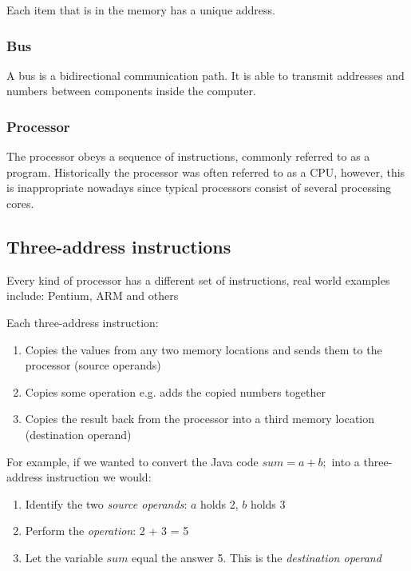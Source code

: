 \documentclass{article}
\begin{document}
Each item that is in the memory has a unique address.

\subsubsection{Bus}
A bus is a bidirectional communication path. It is able to transmit addresses and numbers between components inside the computer.

\subsubsection{Processor}
The processor obeys a sequence of instructions, commonly referred to as a program.
Historically the processor was often referred to as a CPU, however, this is inappropriate nowadays since typical processors consist of several processing cores.

\subsection{Three-address instructions}
Every kind of processor has a different set of instructions, real world examples include: Pentium, ARM and others

Each three-address instruction:
\begin{enumerate}
	\item Copies the values from any two memory locations and sends them to the processor (source operands)
	\item Copies some operation e.g. adds the copied numbers together
	\item Copies the result back from the processor into a third memory location (destination operand)
\end{enumerate}

For example, if we wanted to convert the Java code $sum = a + b;$ into a three-address instruction we would:
\begin{enumerate}
	\item Identify the two {\it source operands}: $a$ holds 2, $b$ holds 3
	\item Perform the {\it operation}: 2 + 3 = 5
	\item Let the variable $sum$ equal the answer 5. This is the {\it destination operand}
\end{enumerate}

\end{document}
